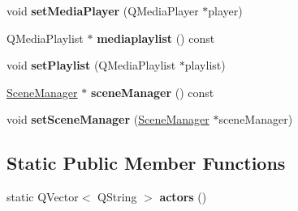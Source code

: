 \begin{DoxyCompactItemize}
\item 
\mbox{\label{classmfg_1_1_engine_ae9401d26bc77d69553e9d4d58bc7ce22}} 
void {\bfseries set\+Media\+Player} (Q\+Media\+Player $\ast$player)
\item 
\mbox{\label{classmfg_1_1_engine_a8d31d4eb54252e8523775f8dff145a92}} 
Q\+Media\+Playlist $\ast$ {\bfseries mediaplaylist} () const
\item 
\mbox{\label{classmfg_1_1_engine_a296fdd5e8062a6cb7214bb3a44bc70e6}} 
void {\bfseries set\+Playlist} (Q\+Media\+Playlist $\ast$playlist)
\item 
\mbox{\label{classmfg_1_1_engine_acba63454459c76adbea96bc609669491}} 
\hyperlink{class_scene_manager}{Scene\+Manager} $\ast$ {\bfseries scene\+Manager} () const
\item 
\mbox{\label{classmfg_1_1_engine_ac673b51dbad9a39968d1e5a57c92b040}} 
void {\bfseries set\+Scene\+Manager} (\hyperlink{class_scene_manager}{Scene\+Manager} $\ast$scene\+Manager)
\end{DoxyCompactItemize}
\subsection*{Static Public Member Functions}
\begin{DoxyCompactItemize}
\item 
\mbox{\label{classmfg_1_1_engine_a826e8e5359c8f5f2516fb7e4ad8ae3a0}} 
static Q\+Vector$<$ Q\+String $>$ {\bfseries actors} ()
\end{DoxyCompactItemize}
